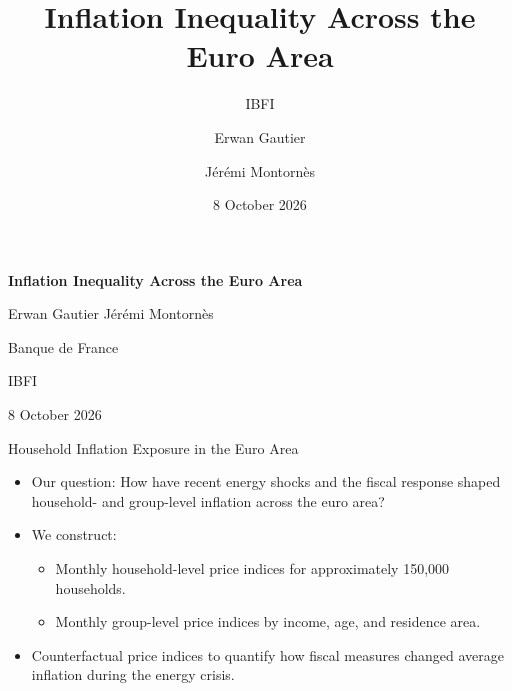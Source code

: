 \documentclass[11pt,aspectratio=169]{beamer}
\title{Inflation Inequality Across the Euro Area}
\author{Erwan Gautier \and J\'er\'emi Montorn\`es}
\institute{Banque de France}
\subtitle{IBFI}
\date{8 October 2026}
\begin{document}
\begin{frame}[plain]
  \centering
  \vspace{0.20\textheight}
  {\LARGE\bfseries Inflation Inequality Across the Euro Area\par}
  \vspace{1.2em}
  {\large Erwan Gautier \qquad J\'er\'emi Montorn\`es\par}
  \vspace{0.6em}
  {\normalsize Banque de France\par}
  \vspace{0.6em}
  {\normalsize IBFI\par}
  \vspace{0.6em}
  {\normalsize 8 October 2026\par}
\end{frame}

\begin{frame}{Household Inflation Exposure in the Euro Area}
\begin{itemize}
\item Our question: How have recent energy shocks and the fiscal response shaped household- and group-level inflation
 across the euro area?

\item We construct:
\begin{itemize}
\item Monthly household-level price indices for approximately 150,000 households.
\item Monthly group-level price indices by income, age, and residence area.
\end{itemize}
\item Counterfactual price indices to quantify how fiscal measures changed average inflation during the energy crisis.

\end{itemize}
\end{frame}
\end{document}

